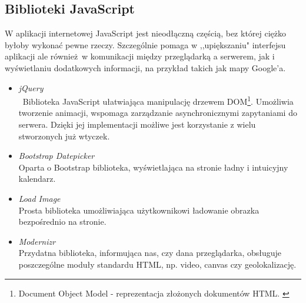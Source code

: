   \subsection{Biblioteki JavaScript}
    W aplikacji internetowej JavaScript\cite{java_script} jest nieodłączną częścią, bez której ciężko byłoby wykonać pewne rzeczy. Szczególnie pomaga w ,,upiększaniu" interfejsu aplikacji ale również w komunikacji między przeglądarką a serwerem, jak i wyświetlaniu dodatkowych informacji, na przykład takich jak mapy Google'a.

    \begin{itemize}
      \item \emph{jQuery} \\ \
      Biblioteka JavaScript ułatwiająca manipulację drzewem DOM\footnote{Document Object Model - reprezentacja złożonych dokumentów HTML. \cite{html5_css3}}. Umożliwia tworzenie animacji, wspomaga zarządzanie asynchronicznymi zapytaniami do serwera. Dzięki jej implementacji możliwe jest korzystanie z wielu stworzonych już wtyczek.
      \item \emph{Bootstrap Datepicker} \\ 
      Oparta o Bootstrap biblioteka, wyświetlająca na stronie ładny i intuicyjny kalendarz.
      \item \emph{Load Image} \\ 
      Prosta biblioteka umożliwiająca użytkownikowi ładowanie obrazka bezpośrednio na stronie.
      \item \emph{Modernizr} \\ 
      Przydatna biblioteka, informująca nas, czy dana przeglądarka, obsługuje poszczególne moduły standardu HTML, np. video, canvas czy geolokalizację.
    \end{itemize}
